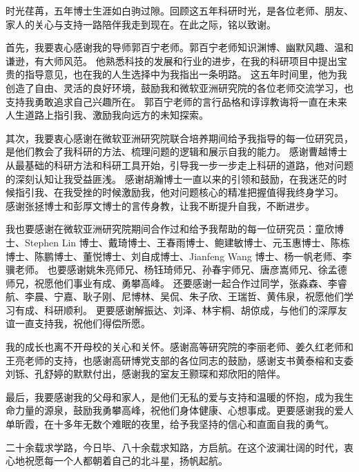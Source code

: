 
\begin{acknowledgements}
  时光荏苒，五年博士生涯如白驹过隙。回顾这五年科研时光，是各位老师、朋友、家人的关心与支持一路陪伴我走到现在。在此之际，铭以致谢。


  首先，我要衷心感谢我的导师郭百宁老师。郭百宁老师知识渊博、幽默风趣、温和谦逊，有大师风范。
  他熟悉科技的发展和行业的进步，在我的科研项目中提出宝贵的指导意见，也在我的人生选择中为我指出一条明路。
  这五年时间里，他为我创造了自由、灵活的良好环境，鼓励我和微软亚洲研究院的各位老师交流学习，也支持我勇敢追求自己兴趣所在。
  郭百宁老师的言行品格和谆谆教诲将一直在未来人生道路上指引我、激励我向远方的未知探索。
  
  其次，我要衷心感谢在微软亚洲研究院联合培养期间给予我指导的每一位研究员，是他们教会了我科研的方法、梳理问题的逻辑和展示自我的能力。
  感谢曹越博士从最基础的科研方法和科研工具开始，引导我一步一步走上科研的道路，他对问题的深刻认知让我受益匪浅。
  感谢胡瀚博士一直以来的引领和鼓励，在我迷茫的时候指引我、在我受挫的时候激励我，他对问题核心的精准把握值得我终身学习。
  感谢张拯博士和彭厚文博士的言传身教，让我不断提升自我，不断进步。

  我也要感谢在微软亚洲研究院期间合作过和给予我帮助的每一位研究员：童欣博士、Stephen Lin 博士、戴琦博士、王春雨博士、鲍建敏博士、元玉惠博士、陈栋博士、陈鹏博士、董悦博士、刘自成博士、Jianfeng Wang 博士、杨一帆老师、李骥老师。
  也要感谢姚朱亮师兄、杨钰琦师兄、孙春宇师兄、唐彦嵩师兄、徐孟德师兄，祝愿他们事业有成、勇攀高峰。
  还要感谢一起合作过同学，张淼森、李睿航、李晨、宁嘉、耿子刚、尼博林、吴侃、朱子欣、王瑞哲、黄伟泉，祝愿他们学习有成、科研顺利。
  更要感谢解振达、刘泽、林宇桐、胡倞成，与他们的深厚友谊一直支持我，祝他们得偿所愿。

  我的成长也离不开母校的关心和关怀。感谢高等研究院的李丽老师、姜久红老师和王亮老师的支持，也感谢高研博党支部的各位同志的鼓励，感谢支书黄泰榕和支委刘铄、孔舒婷的默默付出，感谢我的室友王颢琛和郑欣阳的陪伴。

  最后，我要感谢我的父母和家人，是他们无私的爱与支持和温暖的怀抱，成为我生命力量的源泉，鼓励我勇攀高峰，祝他们身体健康、心想事成。更要感谢我的爱人单昕霞，在十多年无数个难眠的夜里，给予我坚持的信心和直面自我的勇气。

  二十余载求学路，今日毕、八十余载求知路，方启航。在这个波澜壮阔的时代，衷心地祝愿每一个人都朝着自己的北斗星，扬帆起航。
  
  
\end{acknowledgements}
